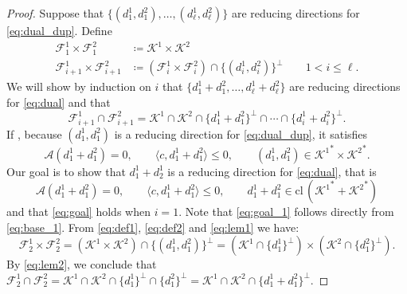 \documentclass{article}
\newcommand{\closure}{\mathrm{cl}\,}
\newcommand{\inProd}[2]{\langle #1 , #2 \rangle }
\newcommand{\stdMap}{ {\mathcal{A}}}
\newcommand{\stdCone}{ {\mathcal{K}}}
\newcommand{\stdFace}{ \mathcal{F}}
\begin{document}
\begin{proof}
Suppose that $\{(d_1^1,d_1^2), \ldots, (d_\ell^1,d_\ell^2) \}$ are reducing directions for \eqref{eq:dual_dup}. Define
\begin{align}
\stdFace _1^1 \times \stdFace _1^2 & \coloneqq \stdCone^1 \times \stdCone^2 \label{eq:def1}\\
\stdFace _{i+1}^1\times \stdFace _{i+1}^2 & \coloneqq (\stdFace _{i}^1\times \stdFace _{i}^2) \cap \{(d_i^1,d_i^2)\}^\perp \qquad  1 < i \leq \ell. \label{eq:def2}
\end{align}
We will show by induction on $i$
that $\{d_1^1+d_1^2, \ldots, d_\ell^1+d_\ell^2 \}$ are  reducing directions for 
\eqref{eq:dual} and that 
\begin{equation}\stdFace ^1_{i+1} \cap \stdFace ^2 _{i+1} =  \stdCone^1 \cap \stdCone^2 \cap \{d_1^1+d_1^2\}^\perp \cap \cdots \cap \{d_i^1+d_i^2\}^\perp. \label{eq:goal}
\end{equation} %
If , because $(d_1^1,d_1^2)$ is a reducing direction for \eqref{eq:dual_dup}, 
it satisfies 
\begin{equation}
\stdMap (d_1^1 + d_1^2) = 0, \qquad \inProd{c}{d_1^1 + d_1^2} \leq 0, \qquad (d_1^1,d_1^2) \in {\stdCone^1}^* \times {\stdCone^2}^*. \label{eq:base_1}
\end{equation}
Our goal is to show that $d_1^1+d_2^1$ is a reducing direction for \eqref{eq:dual}, that is
\begin{equation}
\stdMap (d_1^1 + d_1^2) = 0, \qquad \inProd{c}{d_1^1 + d_1^2} \leq 0, \qquad d_1^1+d_1^2 \in \closure{({\stdCone^1}^* +{\stdCone^2}^*)} \label{eq:goal_1}
\end{equation}
and that \eqref{eq:goal} holds when $i = 1$. Note that 
\eqref{eq:goal_1} follows directly from \eqref{eq:base_1}. From \eqref{eq:def1}, \eqref{eq:def2} and \eqref{eq:lem1} we have:
$$
\stdFace^1 _2 \times \stdFace^2_2 = ({\stdCone^1} \times {\stdCone^2})\cap\{(d_1^1,d_1^2) \}^\perp  = \left({\stdCone^1} \cap \{d_1^1\}^\perp\right) \times \left({\stdCone^2}\cap\{d_1^2\}^\perp\right).
$$
By \eqref{eq:lem2}, we conclude that 
$\stdFace^1 _2 \cap  \stdFace^2_2 = {\stdCone^1} \cap {\stdCone^2}\cap \{d_1^1\}^\perp \cap \{d_1^2 \}^\perp =  {\stdCone^1} \cap {\stdCone^2}\cap \{d_1^1 +d_1^2 \}^\perp$. 


\end{proof}
\end{document}
